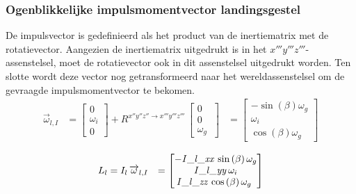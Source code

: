 \subsubsection{Ogenblikkelijke impulsmomentvector landingsgestel}
De impulsvector is gedefinieerd als het product van de inertiematrix met de rotatievector. Aangezien de inertiematrix uitgedrukt is in het $x'''y'''z'''$-assenstelsel, moet de rotatievector ook in dit assenstelsel uitgedrukt worden. Ten slotte wordt deze vector nog getransformeerd naar het wereldassenstelsel om de gevraagde impulsmomentvector te bekomen.
\begin{equation*}
\begin{split}
\overrightarrow{\omega}_{l,I}
&=\begin{bmatrix}
0\\
\omega_{i}\\
0\
\end{bmatrix}
+R^{x''y''z'' \rightarrow x'''y'''z'''}\,
\begin{bmatrix}
0\\
0\\
\omega_{g}\
\end{bmatrix}
&=\begin{bmatrix}
-\sin \left( \beta \right) \omega_{g}
\\
\omega_{i}\\
\cos \left( \beta
 \right) \omega_{g}\
\end{bmatrix}
\end{split}
\end{equation*}

\begin{equation*}
\begin{split}
L_{l}&=I_{l}\,\overrightarrow{\omega}_{l,I}&=
\begin{bmatrix}
-{\it I\_l\_xx}\,\sin \left( \beta \right) 
\omega_{g}\\
{\it I\_l\_yy}\,\omega_{i}
\\
{\it I\_l\_zz}\,\cos \left( \beta \right) \omega_
{g}\
\end{bmatrix}
\end{split}
\end{equation*}

